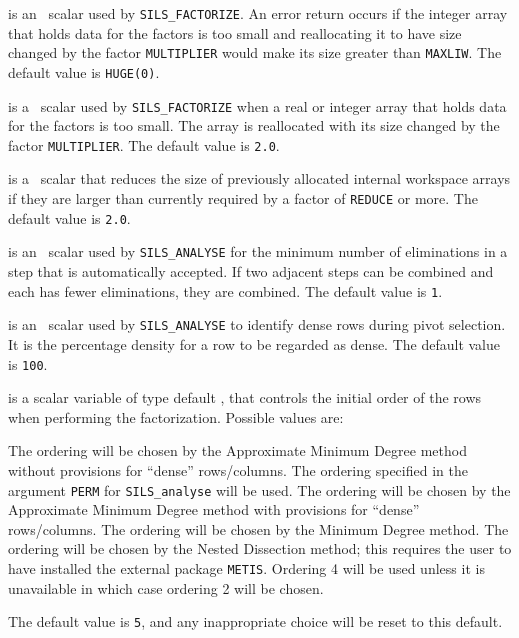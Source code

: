 \documentclass{galahad}
\newcommand{\packagename}{SILS}
\begin{document}
\begin{description}
 is an \integer\ scalar used by {\tt \packagename\_FACTORIZE}. 
An error 
return occurs if the integer array that holds data for the factors is too 
small and reallocating it to have size changed by the factor {\tt MULTIPLIER} 
would make its size greater than {\tt MAXLIW}. The default value is 
{\tt HUGE(0)}. 
 
 is a \realdp\ scalar used by {\tt \packagename\_FACTORIZE} 
when a real or integer array that holds data for the factors is too small. The 
array is reallocated with its size changed by the factor {\tt MULTIPLIER}. 
The default value is {\tt 2.0}.
 
 is a \realdp\ scalar that reduces the size of previously 
allocated 
internal workspace arrays if they are larger than currently required 
by a factor of {\tt REDUCE} or more. The default value is {\tt 2.0}.
 
 is an \integer\ scalar used by {\tt \packagename\_ANALYSE} for the 
  minimum number of eliminations in a step that is automatically 
  accepted. If two adjacent steps can be combined and each has fewer 
  eliminations, they are combined.  The default value is {\tt 1}. 
 
 is an \integer\ scalar used by {\tt \packagename\_ANALYSE} to 
identify dense 
rows during pivot selection.  It is the percentage density for a row to 
be regarded as dense.  The default value is {\tt 100}. 
 
 is a scalar variable of type default \integer, that 
controls the initial order of the rows when performing the factorization.
Possible values are: 
\begin{description} 
 The ordering will be chosen by the Approximate Minimum Degree method
       without provisions for ``dense'' rows/columns.
 The ordering specified in the argument {\tt PERM} for 
       {\tt \packagename\_analyse} will be used.
 The ordering will be chosen by the Approximate Minimum Degree method
       with provisions for ``dense'' rows/columns.
 The ordering will be chosen by the Minimum Degree method.
 The ordering will be chosen by the Nested Dissection method; this
 requires the user to have installed the external package {\tt METIS}.
 Ordering 4 will be used unless it is unavailable in which case 
ordering 2 will be chosen.
\end{description} 
The default value is {\tt 5}, and any inappropriate choice
will be reset to this default.


\end{description}
\end{document}
